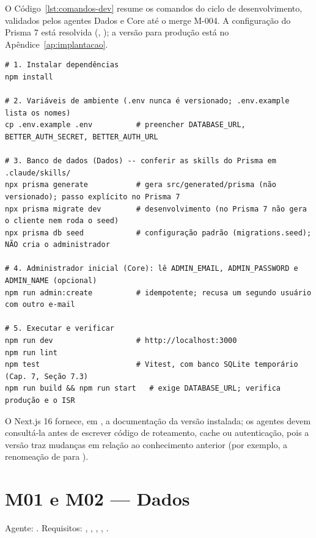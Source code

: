 O Código~\ref{lst:comandos-dev} resume os comandos do ciclo de desenvolvimento, validados pelos agentes Dados e Core até o merge M-004. A configuração do Prisma 7 está resolvida (, ); a versão para produção está no Apêndice~\ref{ap:implantacao}.

\begin{lstlisting}[language=VSh, caption={Comandos do ciclo de desenvolvimento}, label={lst:comandos-dev}]
# 1. Instalar dependências
npm install

# 2. Variáveis de ambiente (.env nunca é versionado; .env.example lista os nomes)
cp .env.example .env          # preencher DATABASE_URL, BETTER_AUTH_SECRET, BETTER_AUTH_URL

# 3. Banco de dados (Dados) -- conferir as skills do Prisma em .claude/skills/
npx prisma generate           # gera src/generated/prisma (não versionado); passo explícito no Prisma 7
npx prisma migrate dev        # desenvolvimento (no Prisma 7 não gera o cliente nem roda o seed)
npx prisma db seed            # configuração padrão (migrations.seed); NÃO cria o administrador

# 4. Administrador inicial (Core): lê ADMIN_EMAIL, ADMIN_PASSWORD e ADMIN_NAME (opcional)
npm run admin:create          # idempotente; recusa um segundo usuário com outro e-mail

# 5. Executar e verificar
npm run dev                   # http://localhost:3000
npm run lint
npm test                      # Vitest, com banco SQLite temporário (Cap. 7, Seção 7.3)
npm run build && npm run start   # exige DATABASE_URL; verifica produção e o ISR
\end{lstlisting}

O Next.js 16 fornece, em , a documentação da versão instalada; os agentes devem consultá-la antes de escrever código de roteamento, cache ou autenticação, pois a versão traz mudanças em relação ao conhecimento anterior (por exemplo, a renomeação de  para ).

\section{M01 e M02 --- Dados}\label{sec:impl-dados}

\noindent{}\quad Agente: . Requisitos: , , , , .

